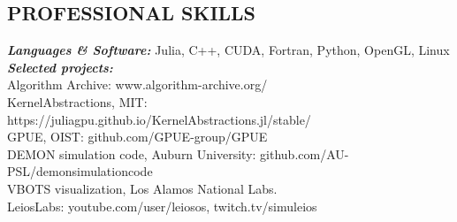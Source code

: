\documentclass[margin, 10pt, a4paper]{res} %
\begin{document}
\begin{resume}

\section{PROFESSIONAL SKILLS} 

{\sl \textbf{Languages \& Software:}} 
Julia, C++, CUDA, Fortran, Python, OpenGL, Linux  \\
{\sl \textbf{Selected projects:}} \\
Algorithm Archive: www.algorithm-archive.org/ \\
KernelAbstractions, MIT: https://juliagpu.github.io/KernelAbstractions.jl/stable/\\
GPUE, OIST: github.com/GPUE-group/GPUE \\
DEMON simulation code, Auburn University: github.com/AU-PSL/demonsimulationcode \\
VBOTS visualization, Los Alamos National Labs. \\
LeiosLabs: youtube.com/user/leiosos, twitch.tv/simuleios




\end{resume}
\end{document}
